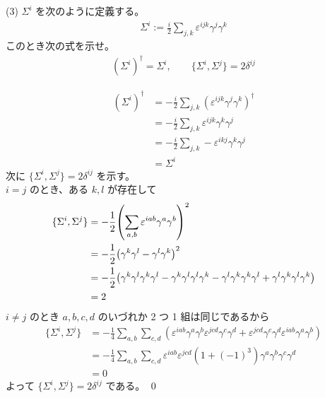 \documentclass[uplatex,dvipdfmx,a4paper,11pt]{jlreq}
\makeatletter
\theoremstyle{definition}
\renewenvironment{proof}[1][\proofname]{\par
  \normalfont
  \topsep6\p@\@plus6\p@ \trivlist
  \item[\hskip\labelsep{\bfseries #1}\@addpunct{\bfseries}]\ignorespaces\quad\par
}{%
  \qed\endtrivlist\@endpefalse
}
\renewcommand\proofname{証明}
\makeatother
\begin{document}
(3) $\Sigma^i$ を次のように定義する。
\begin{align}
  \Sigma^i := \frac{i}{2}\sum_{j,k}\varepsilon^{ijk}\gamma^j\gamma^k
\end{align}
このとき次の式を示せ。
\begin{align}
  (\Sigma^i)^\dagger = \Sigma^i, \qquad \lbrace\Sigma^i, \Sigma^j\rbrace = 2\delta^{ij}
\end{align}
\begin{proof}

  \begin{align}
    (\Sigma^i)^\dagger & = -\frac{i}{2}\sum_{j,k}(\varepsilon^{ijk}\gamma^j\gamma^k)^\dagger \\
                       & = -\frac{i}{2}\sum_{j,k}\varepsilon^{ijk}\gamma^k\gamma^j           \\
                       & = -\frac{i}{2}\sum_{j,k}-\varepsilon^{ikj}\gamma^k\gamma^j          \\
                       & = \Sigma^i
  \end{align}
  次に $\lbrace\Sigma^i, \Sigma^j\rbrace = 2\delta^{ij}$ を示す。 \\
  $i = j$ のとき、ある $k, l$ が存在して
  \begin{align}
    \lbrace\Sigma^i, \Sigma^j\rbrace & = -\frac{1}{2}\qty(\sum_{a,b}\varepsilon^{iab}\gamma^a\gamma^b)^2                                                                                             \\
                                     & = -\frac{1}{2}\qty(\gamma^k\gamma^l - \gamma^l\gamma^k)^2                                                                                                     \\
                                     & = -\frac{1}{2}\qty(\gamma^k\gamma^l\gamma^k\gamma^l - \gamma^k\gamma^l\gamma^l\gamma^k - \gamma^l\gamma^k\gamma^k\gamma^l + \gamma^l\gamma^k\gamma^l\gamma^k) \\
                                     & = 2
  \end{align}
  $i \neq j$ のとき $a, b, c, d$ のいづれか 2 つ 1 組は同じであるから
  \begin{align}
    \lbrace\Sigma^i, \Sigma^j\rbrace & = -\frac{1}{4}\sum_{a,b}\sum_{c,d}(\varepsilon^{iab}\gamma^a\gamma^b\varepsilon^{jcd}\gamma^c\gamma^d + \varepsilon^{jcd}\gamma^c\gamma^d\varepsilon^{iab}\gamma^a\gamma^b) \\
                                     & = -\frac{1}{4}\sum_{a,b}\sum_{c,d}\varepsilon^{iab}\varepsilon^{jcd}(1 + (-1)^3)\gamma^a\gamma^b\gamma^c\gamma^d                                                            \\
                                     & = 0
  \end{align}
  よって $\lbrace\Sigma^i, \Sigma^j\rbrace = 2\delta^{ij}$ である。
\end{proof}
\end{document}
